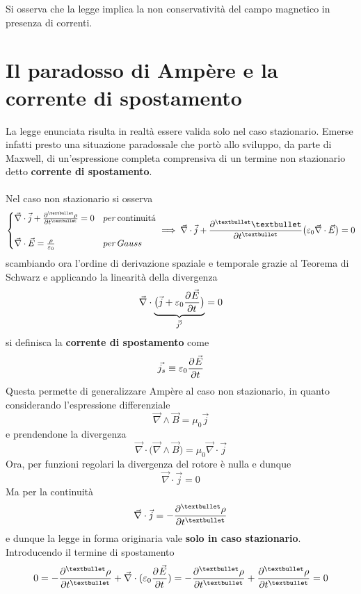 
Si osserva che la legge implica la non conservatività del campo magnetico in presenza di correnti.

\section{Il paradosso di Ampère e la corrente di spostamento}
La legge enunciata risulta in realtà essere valida solo nel caso stazionario. Emerse infatti presto una situazione paradossale che portò allo sviluppo, da parte di Maxwell, di un'espressione completa comprensiva di un termine non stazionario detto \textbf{corrente di spostamento}.
\\~\\
Nel caso non stazionario si osserva
\[
\begin{cases}
\vec{\nabla} \cdot \vec{j} + \pdv[•]{\rho}{t} = 0 & per \, \textrm{continuit\'a}\\
\\
\vec{\nabla} \cdot \vec{E} = \frac{\rho}{\varepsilon_0}  & per \, Gauss
\end{cases} \implies \vec{\nabla} \cdot \vec{j} + \pdv[•]{•}{t} \big(\varepsilon_0 \vec{\nabla} \cdot \vec{E} \big) = 0
\]
scambiando ora l'ordine di derivazione spaziale e temporale grazie al Teorema di Schwarz e applicando la linearità della divergenza
\[\vec{\nabla} \cdot \underbrace{\big(\vec{j} + \varepsilon_0  \pdv[]{\vec{E}}{t}\big)}_{\vec{j'}} = 0\]
si definisca la \textbf{corrente di spostamento} come
\[\vec{j_s} \equiv  \varepsilon_0  \pdv[]{\vec{E}}{t}\]
Questa permette di generalizzare Ampère al caso non stazionario, in quanto considerando l'espressione differenziale
\[\vec{\nabla} \wedge \vec{B} = \mu_0 \vec{j}\]
e prendendone la divergenza
\[\vec{\nabla} \cdot \big(\vec{\nabla} \wedge \vec{B}\big) = \mu_0 \vec{\nabla} \cdot \vec{j}\]
Ora, per funzioni regolari la divergenza del rotore è nulla e dunque
\[\vec{\nabla} \cdot \vec{j} = 0\]
Ma per la continuità
\[\vec{\nabla} \cdot \vec{j} = - \pdv[•]{\rho}{t}\]
e dunque la legge in forma originaria vale \textbf{solo in caso stazionario}. Introducendo il termine di spostamento
\[0 = - \pdv[•]{\rho}{t} + \vec{\nabla} \cdot (\varepsilon_0  \pdv[]{\vec{E}}{t}) = - \pdv[•]{\rho}{t} + \pdv[•]{\rho}{t} = 0\]

